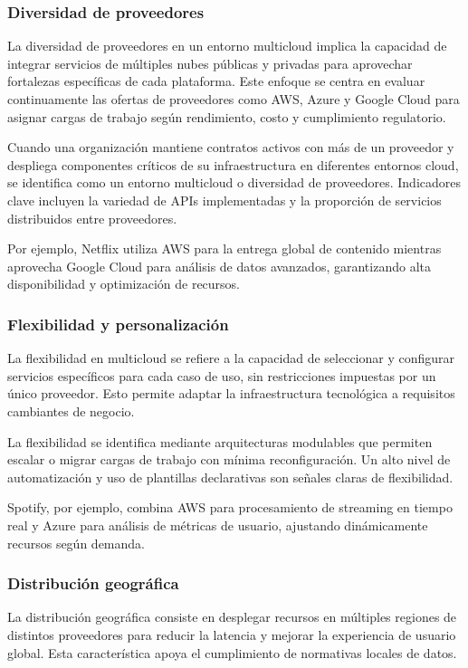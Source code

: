 {            \subsubsection{Diversidad de proveedores}
                La diversidad de proveedores en un entorno multicloud implica la capacidad de integrar servicios de múltiples nubes públicas y privadas para aprovechar fortalezas específicas de cada plataforma. Este enfoque se centra en evaluar continuamente las ofertas de proveedores como AWS, Azure y Google Cloud para asignar cargas de trabajo según rendimiento, costo y cumplimiento regulatorio.
                
                Cuando una organización mantiene contratos activos con más de un proveedor y despliega componentes críticos de su infraestructura en diferentes entornos cloud, se identifica como un entorno multicloud o diversidad de proveedores. Indicadores clave incluyen la variedad de APIs implementadas y la proporción de servicios distribuidos entre proveedores.
                
                Por ejemplo, Netflix utiliza AWS para la entrega global de contenido mientras aprovecha Google Cloud para análisis de datos avanzados, garantizando alta disponibilidad y optimización de recursos.
            
            \subsubsection{Flexibilidad y personalización}
                La flexibilidad en multicloud se refiere a la capacidad de seleccionar y configurar servicios específicos para cada caso de uso, sin restricciones impuestas por un único proveedor. Esto permite adaptar la infraestructura tecnológica a requisitos cambiantes de negocio.
            
                La flexibilidad se identifica mediante arquitecturas modulables que permiten escalar o migrar cargas de trabajo con mínima reconfiguración. Un alto nivel de automatización y uso de plantillas declarativas son señales claras de flexibilidad.
                
                Spotify, por ejemplo, combina AWS para procesamiento de streaming en tiempo real y Azure para análisis de métricas de usuario, ajustando dinámicamente recursos según demanda.
            
            \subsubsection{Distribución geográfica}
                La distribución geográfica consiste en desplegar recursos en múltiples regiones de distintos proveedores para reducir la latencia y mejorar la experiencia de usuario global. Esta característica apoya el cumplimiento de normativas locales de datos.
                
}
